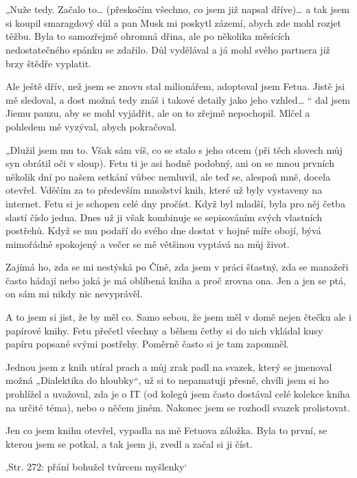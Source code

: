 \chapter{}
„Nuže tedy. Začalo to… (přeskočím všechno, co jsem již napsal dříve)… a tak jsem si koupil smaragdový důl a pan Musk mi poskytl zázemí, abych zde mohl rozjet těžbu. Byla to samozřejmě ohromná dřina, ale po několika měsících nedostatečného spánku se zdařilo. Důl vydělával a já mohl svého partnera již brzy štědře vyplatit.

Ale ještě dřív, než jsem se znovu stal milionářem, adoptoval jsem Fetua. Jistě jsi mě sledoval, a dost možná tedy znáš i takové detaily jako jeho vzhled… “ dal jsem Jiemu pauzu, aby se mohl vyjádřit, ale on to zřejmě nepochopil. Mlčel a pohledem mě vyzýval, abych pokračoval.

„Dlužil jsem mu to. Však sám víš, co se stalo s jeho otcem (při těch slovech můj syn obrátil oči v sloup). Fetu ti je asi hodně podobný, ani on se mnou prvních několik dní po našem setkání vůbec nemluvil, ale teď se, alespoň mně, docela otevřel. Vděčím za to především množství knih, které už byly vystaveny na internet. Fetu si je schopen celé dny pročíst. Když byl mladší, byla pro něj četba slastí číslo jedna. Dnes už ji však kombinuje se sepisováním svých vlastních postřehů. Když se mu podaří do svého dne dostat v hojné míře obojí, bývá mimořádně spokojený a večer se mě většinou vyptává na můj život. 

Zajímá ho, zda se mi nestýská po Číně, zda jsem v práci šťastný, zda se manažeři často hádají nebo jaká je má oblíbená kniha a proč zrovna ona. Jen a jen se ptá, on sám mi nikdy nic nevyprávěl.

A to jsem si jist, že by měl co. Samo sebou, že jsem měl v domě nejen čtečku ale i papírové knihy. Fetu přečetl všechny a během četby si do nich vkládal kusy papíru popsané svými postřehy. Poměrně často si je tam zapomněl.

Jednou jsem z knih utíral prach a můj zrak padl na svazek, který se jmenoval možná „Dialektika do hloubky“, už si to nepamatuji přesně, chvíli jsem si ho prohlížel a uvažoval, zda je o IT (od kolegů jsem často dostával celé kolekce kniha na určité téma), nebo o něčem jiném. Nakonec jsem se rozhodl svazek prolistovat.

Jen co jsem knihu otevřel, vypadla na mě Fetuova záložka. Byla to první, se kterou jsem se potkal, a tak jsem ji, zvedl a začal si ji číst.

‚Str. 272: přání bohužel tvůrcem myšlenky‘


